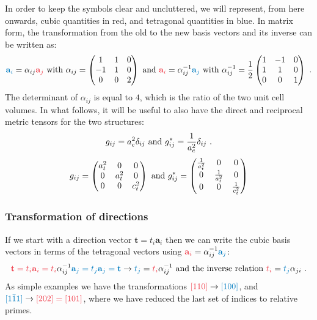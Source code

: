In order to keep the symbols clear and uncluttered, we will represent, from here onwards, cubic quantities in {\color{OCScotsRose}red}, and tetragonal quantities in {\color{OCHighlandsSkyBlue}blue}.  In matrix form, the transformation from the {\color{OCScotsRose}old}  to the {\color{OCHighlandsSkyBlue}new} basis vectors and its inverse can be written as:
\[
	{\color{OCHighlandsSkyBlue}\mathbf{a}_i} = \alpha_{ij}{\color{OCScotsRose}\mathbf{a}_j}\text{ with } \alpha_{ij}=\begin{pmatrix}1&1&0\\ -1&1&0\\ 0&0&2\end{pmatrix}\text{ and } {\color{OCScotsRose}\mathbf{a}_i}=\alpha^{-1}_{ij}{\color{OCHighlandsSkyBlue}\mathbf{a}_j}\text{ with }\alpha^{-1}_{ij} = \frac{1}{2}\begin{pmatrix}1&-1&0\\ 1&1&0\\ 0&0&1\end{pmatrix}\ .
\] 
The determinant of $ \alpha_{ij}$ is equal to $4$, which is the ratio of the two unit cell volumes. In what follows, it will be useful to also have the direct and reciprocal metric tensors for the two structures:
{\color{OCScotsRose}\[
	g_{ij} = a_c^2\delta_{ij}\text{ {\color{OCBlack}and} } g^{\ast}_{ij} = \frac{1}{a_c^2}\delta_{ij}\ .
\]}
{\color{OCHighlandsSkyBlue}\[
	g_{ij} = \begin{pmatrix}a_t^2&0&0\\ 0&a_t^2&0\\ 0&0&c_t^2\end{pmatrix}\text{ {\color{OCBlack}and} } g^{\ast}_{ij} = \begin{pmatrix}\frac{1}{a_t^2}&0&0\\ 0&\frac{1}{a_t^2}&0\\ 0&0&\frac{1}{c_t^2}\end{pmatrix}
\]}

\subsubsection{Transformation of directions}
If we start with a direction vector {\color{OCScotsRose}$\mathbf{t}=t_i\mathbf{a}_i$} then we can write the cubic basis vectors in terms of the tetragonal vectors using ${\color{OCScotsRose}\mathbf{a}_i}=\alpha^{-1}_{ij}{\color{OCHighlandsSkyBlue}\mathbf{a}_j}$:
\[
	{\color{OCScotsRose}\mathbf{t}=t_i\mathbf{a}_i = t_i}\alpha^{-1}_{ij}{\color{OCHighlandsSkyBlue}\mathbf{a}_j=t_j\mathbf{a}_j=\mathbf{t}}\rightarrow
	{\color{OCHighlandsSkyBlue}t_j}={\color{OCScotsRose}t_i}\alpha^{-1}_{ij} \text{ and the inverse relation }{\color{OCScotsRose}t_i}={\color{OCHighlandsSkyBlue}t_j}\alpha_{ji}\ .
\]
As simple examples we have the transformations ${\color{OCScotsRose}[110]}\rightarrow{\color{OCHighlandsSkyBlue}[100]}$, and ${\color{OCHighlandsSkyBlue}[1\bar{1}1]}\rightarrow{\color{OCScotsRose}[202]=[101]}$, where we have reduced the last set of indices to relative primes.

